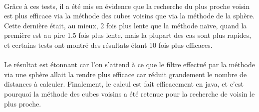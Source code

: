 \paragraph{}
Grâce à ces tests, il a été mis en évidence que la recherche du plus proche
voisin est plus efficace via la méthode des cubes voisins que via la méthode de
la sphère. Cette dernière était, au mieux, 2 fois plus lente que la méthode
naïve, quand la première est au pire 1.5 fois plus lente, mais la plupart des
cas sont plus rapides, et certains tests ont montré des résultats étant 10 fois
plus efficaces.

\paragraph{}
Le résultat est étonnant car l'on s'attend à ce que le filtre effectué par la
méthode via une sphère allait la rendre plus efficace car réduit grandement le
nombre de distances à calculer. Finalement, le calcul est fait efficacement en
java, et c'est pourquoi la méthode des cubes voisins a été retenue pour la
recherche de voisin le plus proche.
